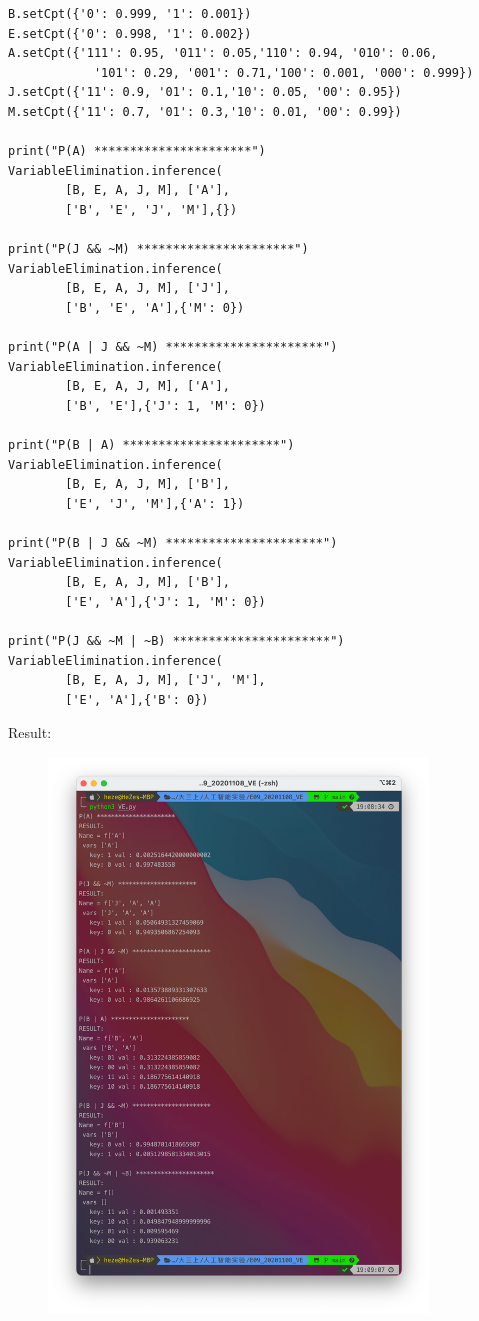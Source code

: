 \documentclass[a4paper, 11pt]{article}
\begin{document}
\begin{lstlisting}
B.setCpt({'0': 0.999, '1': 0.001})
E.setCpt({'0': 0.998, '1': 0.002})
A.setCpt({'111': 0.95, '011': 0.05,'110': 0.94, '010': 0.06,
            '101': 0.29, '001': 0.71,'100': 0.001, '000': 0.999})
J.setCpt({'11': 0.9, '01': 0.1,'10': 0.05, '00': 0.95})
M.setCpt({'11': 0.7, '01': 0.3,'10': 0.01, '00': 0.99})

print("P(A) **********************")
VariableElimination.inference(
        [B, E, A, J, M], ['A'],
        ['B', 'E', 'J', 'M'],{})

print("P(J && ~M) **********************")
VariableElimination.inference(
        [B, E, A, J, M], ['J'],
        ['B', 'E', 'A'],{'M': 0})

print("P(A | J && ~M) **********************")
VariableElimination.inference(
        [B, E, A, J, M], ['A'],
        ['B', 'E'],{'J': 1, 'M': 0})

print("P(B | A) **********************")
VariableElimination.inference(
        [B, E, A, J, M], ['B'],
        ['E', 'J', 'M'],{'A': 1})

print("P(B | J && ~M) **********************")
VariableElimination.inference(
        [B, E, A, J, M], ['B'],
        ['E', 'A'],{'J': 1, 'M': 0})

print("P(J && ~M | ~B) **********************")
VariableElimination.inference(
        [B, E, A, J, M], ['J', 'M'],
        ['E', 'A'],{'B': 0})
\end{lstlisting}
Result:
\begin{figure}[ht]
  \centering
  \includegraphics[width=0.9\textwidth]{Pic/1.png}
  \qquad
\end{figure}


%
%
\end{document}
